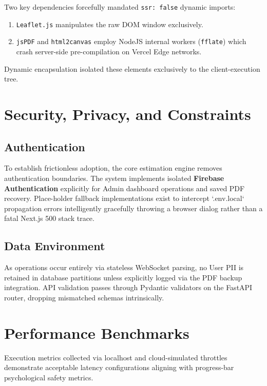 \documentclass[11pt, a4paper]{report}
\begin{document}
Two key dependencies forcefully mandated \texttt{ssr: false} dynamic imports:
\begin{enumerate}
    \item \texttt{Leaflet.js} manipulates the raw DOM window exclusively. 
    \item \texttt{jsPDF} and \texttt{html2canvas} employ NodeJS internal workers (\texttt{fflate}) which crash server-side pre-compilation on Vercel Edge networks. 
\end{enumerate}
Dynamic encapsulation isolated these elements exclusively to the client-execution tree.

\chapter{Security, Privacy, and Constraints}

\section{Authentication}
To establish frictionless adoption, the core estimation engine removes authentication boundaries. The system implements isolated \textbf{Firebase Authentication} explicitly for Admin dashboard operations and saved PDF recovery. Place-holder fallback implementations exist to intercept `.env.local` propagation errors intelligently gracefully throwing a browser dialog rather than a fatal Next.js 500 stack trace.

\section{Data Environment}
As operations occur entirely via stateless WebSocket parsing, no User PII is retained in database partitions unless explicitly logged via the PDF backup integration. 
API validation passes through Pydantic validators on the FastAPI router, dropping mismatched schemas intrinsically.

\chapter{Performance Benchmarks}

Execution metrics collected via localhost and cloud-simulated throttles demonstrate acceptable latency configurations aligning with progress-bar psychological safety metrics.
\end{document}
